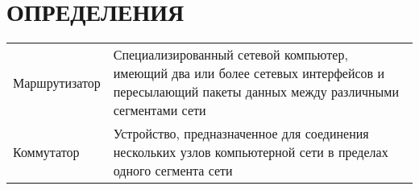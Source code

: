 
\chapter*{ОПРЕДЕЛЕНИЯ}

\begin{table*}
	\begin{tabular}{p{}p{}}
		Маршрутизатор & Специализированный сетевой компьютер, имеющий два или более сетевых интерфейсов и пересылающий пакеты данных между различными сегментами сети \\
	
		Коммутатор & Устройство, предназначенное для соединения нескольких узлов компьютерной сети в пределах одного сегмента сети\\
	
		
	\end{tabular}
	\label{tab:tabular}
\end{table*}




